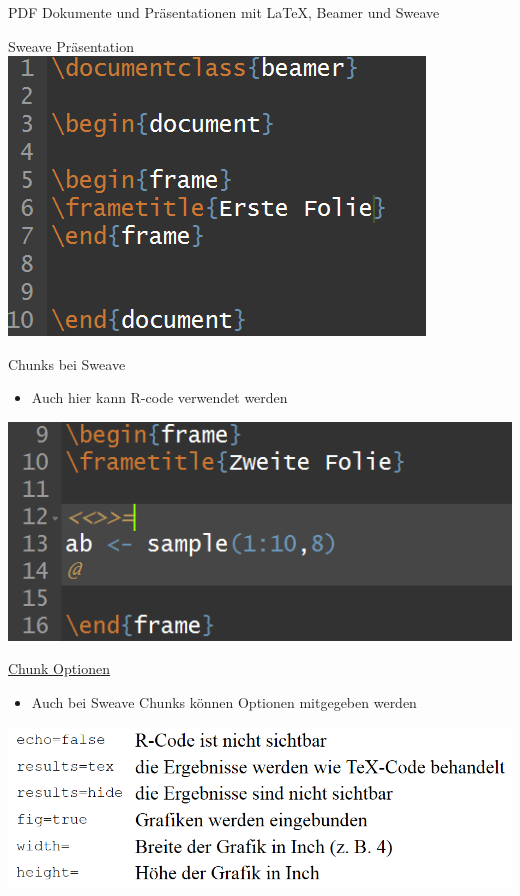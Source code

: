 \documentclass[ignorenonframetext,]{beamer}
\providecommand{\tightlist}{%
\setlength{\itemsep}{0pt}\setlength{\parskip}{0pt}}
\begin{document}
\begin{frame}[fragile]{PDF Dokumente und Präsentationen mit LaTeX,
Beamer und Sweave}
\begin{block}{Sweave Präsentation}
\includegraphics{./tex2pdf.9796/f0b3937ec5719dee8af0820e3319c115f1f85dc1.png}

\end{block}

\begin{block}{Chunks bei Sweave}

\begin{itemize}
\tightlist
\item
  Auch hier kann R-code verwendet werden
\end{itemize}

\includegraphics{./tex2pdf.9796/16eacd9128dd06a03d6e05d75dee57d98cb1fe25.png}

\end{block}

\begin{block}{\href{http://k-baeumchen.fuhlbrueck.net/R-und-LaTeX.html}{Chunk
Optionen}}

\begin{itemize}
\tightlist
\item
  Auch bei Sweave Chunks können Optionen mitgegeben werden
\end{itemize}

\includegraphics{./tex2pdf.9796/02f24b7a4ad8b23dfc56749a2f2585e9e686e644.png}


\end{block}
\end{frame}
\end{document}
